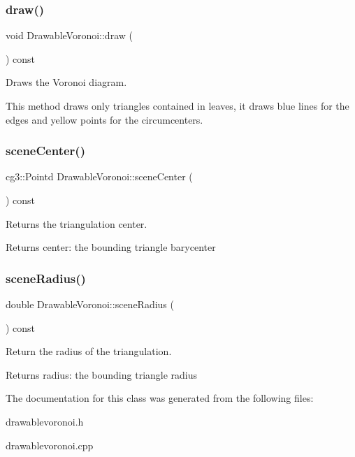 \subsubsection{\texorpdfstring{draw()}{draw()}}
{\footnotesize\ttfamily void Drawable\+Voronoi\+::draw (\begin{DoxyParamCaption}{ }\end{DoxyParamCaption}) const}



Draws the Voronoi diagram. 

This method draws only triangles contained in leaves, it draws blue lines for the edges and yellow points for the circumcenters. \mbox{\label{classDrawableVoronoi_a1707c9e575880eeac9e981d73e03b3bf}} 
\subsubsection{\texorpdfstring{scene\+Center()}{sceneCenter()}}
{\footnotesize\ttfamily cg3\+::\+Pointd Drawable\+Voronoi\+::scene\+Center (\begin{DoxyParamCaption}{ }\end{DoxyParamCaption}) const}



Returns the triangulation center. 

\begin{DoxyReturn}{Returns}
center\+: the bounding triangle barycenter 
\end{DoxyReturn}
\mbox{\label{classDrawableVoronoi_af26652a83c96748bf9a09abc6255672b}} 
\subsubsection{\texorpdfstring{scene\+Radius()}{sceneRadius()}}
{\footnotesize\ttfamily double Drawable\+Voronoi\+::scene\+Radius (\begin{DoxyParamCaption}{ }\end{DoxyParamCaption}) const}



Return the radius of the triangulation. 

\begin{DoxyReturn}{Returns}
radius\+: the bounding triangle radius 
\end{DoxyReturn}


The documentation for this class was generated from the following files\+:\begin{DoxyCompactItemize}
\item 
drawablevoronoi.\+h\item 
drawablevoronoi.\+cpp\end{DoxyCompactItemize}
